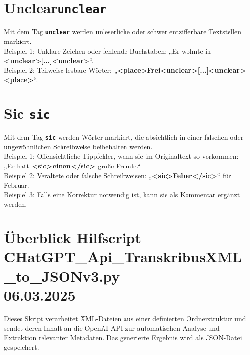 \documentclass{article}
\begin{document}
\section*{Unclear\texttt{\textbf{{\colorbox{unclear}{unclear}}}}}


Mit dem Tag \texttt{\texttt{\textbf{{\colorbox{unclear}{unclear}}}}} werden unleserliche oder schwer entzifferbare Textstellen markiert. \\

\noindent{} Beispiel 1: Unklare Zeichen oder fehlende Buchstaben: „Er wohnte in \textbf{\textless unclear\textgreater [...]\textless unclear\textgreater }“.\\
 Beispiel 2: Teilweise lesbare Wörter: „\textbf{\textless place\textgreater Frei\textless unclear\textgreater [...]\textless unclear\textgreater \textless place\textgreater }“.\\


\section*{Sic \texttt{\textbf{{\colorbox{sic}{sic}}}}}


Mit dem Tag \texttt{\texttt{\textbf{{\colorbox{sic}{sic}}}}} werden Wörter markiert, die absichtlich in einer falschen oder ungewöhnlichen Schreibweise beibehalten werden. \\

\noindent{} Beispiel 1: Offensichtliche Tippfehler, wenn sie im Originaltext so vorkommen: „Er hatt \textbf{\textless sic\textgreater einen\textless /sic\textgreater } große Freude.“\\
 Beispiel 2: Veraltete oder falsche Schreibweisen: „\textbf{\textless sic\textgreater Feber\textless /sic\textgreater }“ für Februar.\\
 Beispiel 3: Falls eine Korrektur notwendig ist, kann sie als Kommentar ergänzt werden. \\


\newpage %


\section{Überblick Hilfscript\\CHatGPT\_Api\_TranskribusXML\_to\_JSONv3.py \\\small 06.03.2025}
Dieses Skript verarbeitet XML-Dateien aus einer definierten Ordnerstruktur und sendet deren Inhalt an die OpenAI-API zur automatischen Analyse und Extraktion relevanter Metadaten. Das generierte Ergebnis wird als JSON-Datei gespeichert.
\end{document}
